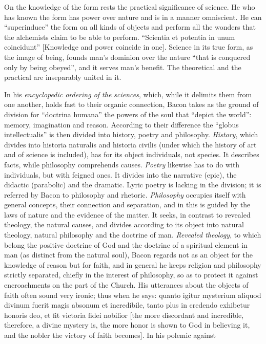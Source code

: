 On the knowledge of the form rests the practical significance of science. He who has known the form has power
over nature and is in a manner omniscient. He can ``superinduce'' the form on all kinds of objects and perform
all the wonders that the alchemists claim to be able
to perform. ``Scientia et potentia in unum coincidunt'' [Knowledge and power coincide in one].
Science in its true form, as the image of being, founds man's dominion over the nature ``that is
conquered only by being obeyed'', and it serves man's benefit.
The theoretical and the practical are inseparably united
in it.

\divrule

In his \emph{encyclopedic ordering of the sciences}, which,
while it delimits them from one another, holds fast to their
organic connection, Bacon takes as the ground of division for ``doctrina humana'' the powers of the soul that ``depict the world'': memory,
imagination and reason. According to their difference
the ``globus intellectualis'' is then divided into history, poetry and philosophy. \emph{History}, which divides into historia naturalis and historia civilis (under which the history of art and of science is included), has for its
object individuals, not species. It describes facts, while philosophy comprehends causes. \emph{Poetry} likewise
has to do with individuals, but with feigned ones. It
divides into the narrative (epic), the didactic (parabolic)
and the dramatic. Lyric poetry is lacking in the division;
it is referred by Bacon to philosophy and rhetoric. \emph{Philosophy} occupies itself with general concepts,
their connection and separation, and in this is guided by the laws of nature and the evidence of the matter. It seeks, in contrast
to revealed theology, the natural causes, and divides
according to its object into natural theology, natural philosophy and
the doctrine of man. \emph{Revealed theology}, to
which belong the positive doctrine of God and the doctrine of a spiritual element
in man (as distinct from the natural soul), Bacon regards not as an object for the knowledge of reason
but for faith, and in general he keeps religion and philosophy strictly separated, chiefly in the interest of philosophy, so as
to protect it against encroachments on the part of the Church. His utterances
about the objects of faith often sound very ironic; thus when
he says: quanto igitur mysterium aliquod divinum fuerit
magis absonum et incredibile, tanto plus in credendo exhibetur
honoris deo, et fit victoria fidei nobilior [the more discordant and incredible, therefore, a divine mystery is, the more honor is shown to God in believing it, and the nobler the victory of faith becomes]. In his polemic against

